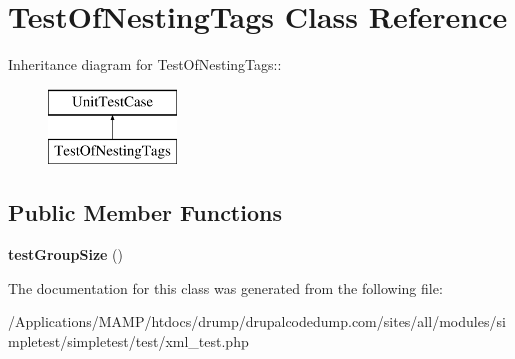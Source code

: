 \hypertarget{class_test_of_nesting_tags}{
\section{TestOfNestingTags Class Reference}
\label{class_test_of_nesting_tags}
}
Inheritance diagram for TestOfNestingTags::\begin{figure}[H]
\begin{center}
\leavevmode
\includegraphics[height=2cm]{class_test_of_nesting_tags}
\end{center}
\end{figure}
\subsection*{Public Member Functions}
\begin{DoxyCompactItemize}
\item 
\hypertarget{class_test_of_nesting_tags_a7e5525653e1eaf0f00d5b4c6ed05bbd9}{
{\bfseries testGroupSize} ()}
\label{class_test_of_nesting_tags_a7e5525653e1eaf0f00d5b4c6ed05bbd9}

\end{DoxyCompactItemize}


The documentation for this class was generated from the following file:\begin{DoxyCompactItemize}
\item 
/Applications/MAMP/htdocs/drump/drupalcodedump.com/sites/all/modules/simpletest/simpletest/test/xml\_\-test.php\end{DoxyCompactItemize}
